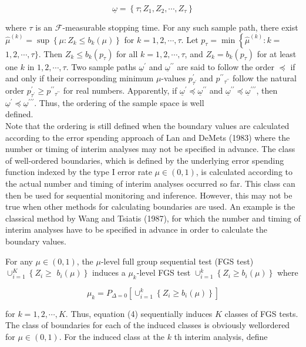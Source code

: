 \documentclass[10pt]{article}
\begin{document}
$$
\underline{\omega}=\left\{\tau ; Z_{1}, Z_{2}, \cdots, Z_{\tau}\right\}
$$

where $\tau$ is an $\mathcal{F}$-measurable stopping time. For any such sample path, there exist $\hat{\mu}^{(k)}=\sup \left\{\mu: Z_{k} \leq b_{k}(\mu)\right\}$ for $k=1,2, \cdots, \tau$. Let $p_{\tau}=\min \left\{\hat{\mu}^{(k)}: k=\right.$ $1,2, \cdots, \tau\}$. Then $Z_{k} \leq b_{k}\left(p_{\tau}\right)$ for all $k=1,2, \cdots, \tau$, and $Z_{k}=b_{k}\left(p_{\tau}\right)$ for at least one $k$ in $1,2, \cdots, \tau$. Two sample paths $\underline{\omega}^{\prime}$ and $\underline{\omega}^{\prime \prime}$ are said to follow the order $\preceq$ if and only if their corresponding minimum $\mu$-values $p_{\tau^{\prime}}^{\prime}$ and $p^{\prime \prime}{ }_{\tau^{\prime \prime}}$ follow the natural order $p_{\tau^{\prime}}^{\prime} \geq p^{\prime \prime}{ }_{\tau^{\prime \prime}}$ for real numbers. Apparently, if $\underline{\omega}^{\prime} \preceq \underline{\omega}^{\prime \prime}$ and $\underline{\omega}^{\prime \prime} \preceq \underline{\omega}^{\prime \prime \prime}$, then $\underline{\omega}^{\prime} \preceq \underline{\omega}^{\prime \prime \prime}$. Thus, the ordering of the sample space is well\\
defined.\\
Note that the ordering is still defined when the boundary values are calculated according to the error spending approach of Lan and DeMets (1983) where the number or timing of interim analyses may not be specified in advance. The class of well-ordered boundaries, which is defined by the underlying error spending function indexed by the type I error rate $\mu \in(0,1)$, is calculated according to the actual number and timing of interim analyses occurred so far. This class can then be used for sequential monitoring and inference. However, this may not be true when other methods for calculating boundaries are used. An example is the classical method by Wang and Tsiatis (1987), for which the number and timing of interim analyses have to be specified in advance in order to calculate the boundary values.

For any $\mu \in(0,1)$, the $\mu$-level full group sequential test (FGS test) $\cup_{i=1}^{K}\left\{Z_{i} \geq\right.$ $\left.b_{i}(\mu)\right\}$ induces a $\mu_{k}$-level FGS test $\cup_{i=1}^{k}\left\{Z_{i} \geq b_{i}(\mu)\right\}$ where

$$
\mu_{k}=P_{\Delta=0}\left[\cup_{i=1}^{k}\left\{Z_{i} \geq b_{i}(\mu)\right\}\right]
$$

for $k=1,2, \cdots, K$. Thus, equation (4) sequentially induces $K$ classes of FGS tests. The class of boundaries for each of the induced classes is obviously wellordered for $\mu \in(0,1)$. For the induced class at the $k$ th interim analysis, define
\end{document}

